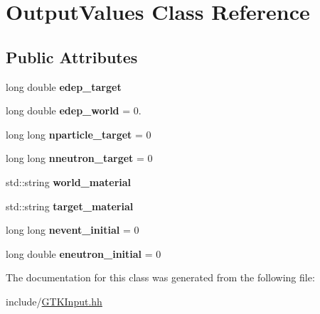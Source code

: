 \hypertarget{classOutputValues}{}\section{Output\+Values Class Reference}
\label{classOutputValues}
\subsection*{Public Attributes}
\begin{DoxyCompactItemize}
\item 
\mbox{\label{classOutputValues_a013df34f07ece3c720cfa3ef462baf82}} 
long double {\bfseries edep\+\_\+target}
\item 
\mbox{\label{classOutputValues_a8db6b22c65174226bf75b264c429139d}} 
long double {\bfseries edep\+\_\+world} = 0.
\item 
\mbox{\label{classOutputValues_a85926d9c2fbd8967bd4bedc3cdc9a9ea}} 
long long {\bfseries nparticle\+\_\+target} = 0
\item 
\mbox{\label{classOutputValues_a0ee5c2f5f8855873bf9a471eb795c297}} 
long long {\bfseries nneutron\+\_\+target} = 0
\item 
\mbox{\label{classOutputValues_a4c57cdc9121114148179b250be9a3f55}} 
std\+::string {\bfseries world\+\_\+material}
\item 
\mbox{\label{classOutputValues_a7703523c094eb54aed884735f8811b5c}} 
std\+::string {\bfseries target\+\_\+material}
\item 
\mbox{\label{classOutputValues_a00d3af733855600703105f6e9b423c52}} 
long long {\bfseries nevent\+\_\+initial} = 0
\item 
\mbox{\label{classOutputValues_adc64463195db40f08ccd9d64b9ff70b5}} 
long double {\bfseries eneutron\+\_\+initial} = 0
\end{DoxyCompactItemize}


The documentation for this class was generated from the following file\+:\begin{DoxyCompactItemize}
\item 
include/\hyperlink{GTKInput_8hh}{G\+T\+K\+Input.\+hh}\end{DoxyCompactItemize}

